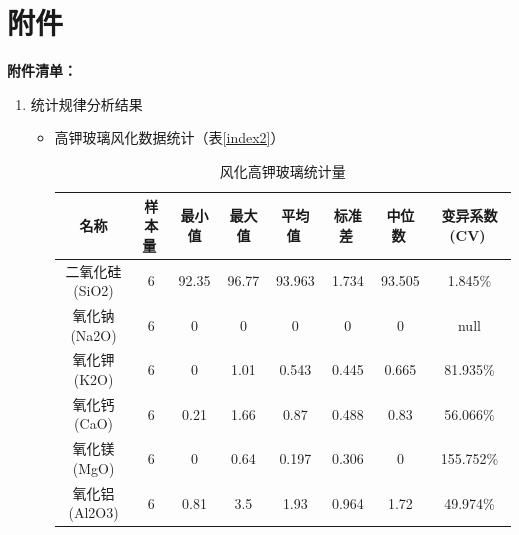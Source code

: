 \documentclass{my_paper}
\begin{document}
\section{附件}
\textbf{附件清单：}
\renewcommand\theenumi{\roman{enumi}}
\renewcommand\labelenumi{\textbf{附录\theenumi}}
\begin{enumerate}
    \item 统计规律分析结果
    \begin{itemize}
        \item 高钾玻璃风化数据统计（表\ref{index2}）
        
        \begin{table}[ht]
            \centering
            \caption{风化高钾玻璃统计量}
            \begin{tabular}{cccccccc}
            \toprule
            名称                   & 样本量                 & 最小值                  & 最大值                  & 平均值                 & 标准差                 & 中位数                 & 变异系数(CV)            \\
            \midrule
            二氧化硅(SiO2)           & 6                    & 92.35                & 96.77                & 93.963               & 1.734                & 93.505               & 1.845\%              \\
            氧化钠(Na2O)            & 6                    & 0                    & 0                    & 0                    & 0                    & 0                    & null                 \\
            氧化钾(K2O)             & 6                    & 0                    & 1.01                 & 0.543                & 0.445                & 0.665                & 81.935\%             \\
            氧化钙(CaO)             & 6                    & 0.21                 & 1.66                 & 0.87                 & 0.488                & 0.83                 & 56.066\%             \\
            氧化镁(MgO)             & 6                    & 0                    & 0.64                 & 0.197                & 0.306                & 0                    & 155.752\%            \\
            氧化铝(Al2O3)           & 6                    & 0.81                 & 3.5                  & 1.93                 & 0.964                & 1.72                 & 49.974\%             \\

\end{tabular}
\end{table}
\end{itemize}
\end{enumerate}
\end{document}
